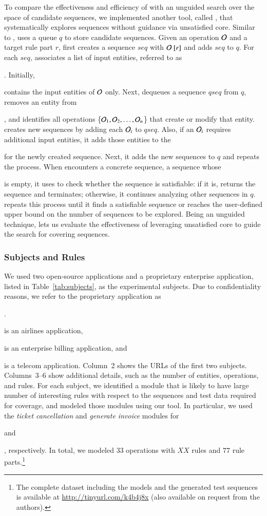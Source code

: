 To compare the effectiveness and efficiency of \tool{} with an unguided search
over the space of candidate sequences, we implemented another tool, called
\exhaust{}, that systematically explores sequences without guidance via
unsatisfied core. Similar to \tool{}, \exhaust{} uses a queue $q$ to store
candidate sequences. Given an operation ${\cal O}$ and a target rule part $r$,
\exhaust{} first creates a sequence $seq$ with ${\cal O}\ [r]$ and adds $seq$ to
$q$. For each $seq$, \exhaust{} associates a list of input entities, referred to
as \subject{ilist}.  Initially, \subject{ilist} contains the input entities of
${\cal O}$ only.  Next, \exhaust{} dequeues a sequence $qseq$ from $q$, removes
an entity from \subject{ilist}, and identifies all operations \{${\cal O}_1,
{\cal O}_2, \ldots, {\cal O}_n$\} that create or modify that entity. \exhaust{}
creates new sequences by adding each ${\cal O}_i$ to $qseq$. Also, if an ${\cal
  O}_i$ requires additional input entities, it adds those entities to the
\subject{ilist} for the newly created sequence. Next, it adds the new sequences
to $q$ and repeats the process. When \exhaust{} encounters a concrete sequence,
\ie{} a sequence whose \subject{ilist} is empty, it uses \choco{} to check
whether the sequence is satisfiable: if it is, \exhaust{} returns the sequence
and terminates; otherwise, it continues analyzing other sequences in
$q$. \exhaust{} repeats this process until it finds a satisfiable sequence or
reaches the user-defined upper bound on the number of sequences to be
explored. Being an unguided technique, \exhaust{} lets us evaluate the
effectiveness of leveraging unsatisfied core to guide the search for covering
sequences.

\subsubsection{Subjects and Rules}

We used two open-source applications and a proprietary enterprise application,
listed in Table~\ref{tab:subjects}, as the experimental subjects. Due to
confidentiality reasons, we refer to the proprietary application as
\subject{App}. \subject{Cebu-pacific} is an airlines application,
\subject{jBilling} is an enterprise billing application, and \subject{App} is a
telecom application. Column~2 shows the URLs of the first two subjects.
Columns~3--6 show additional details, such as the number of entities,
operations, and rules. For each subject, we identified a module that is likely
to have large number of interesting rules with respect to the sequences and test
data required for coverage, and modeled those modules using our tool. In
particular, we used the \textit{ticket cancellation} and \textit{generate
  invoice} modules for \subject{Cebu-pacific} and \subject{jBilling},
respectively. In total, we modeled $33$ operations with $XX$ rules and $77$ rule
parts.\footnote{\small The complete dataset including the models and the
  generated test sequences is available at \url{http://tinyurl.com/k4b4j8x}
  (also available on request from the authors).}

